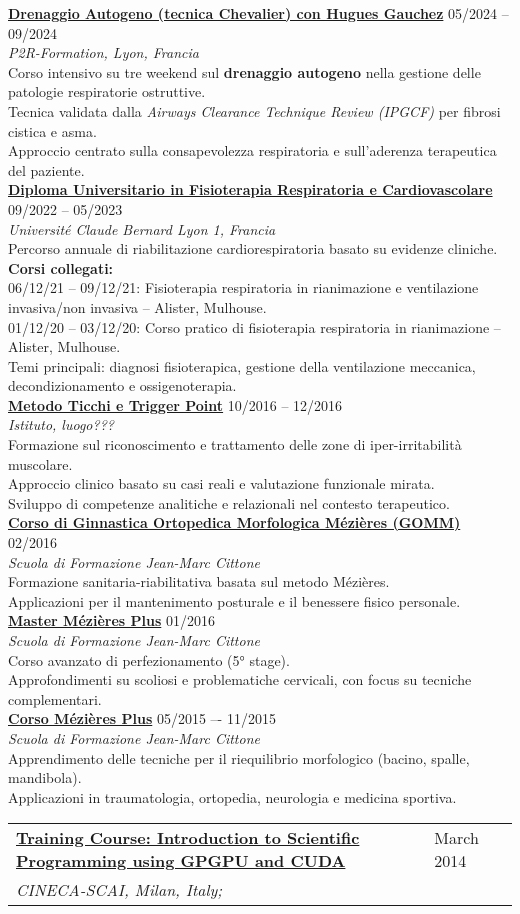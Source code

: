 \documentclass[a4paper]{article}
\newcommand{\longvoice}[8]{
    \begin{tabular}{p{0.83\linewidth} p{0.17\linewidth} }
        \textbf{\href{#3}{#2: #1}} & #4 
        \\ 
        \textit{#5, #6, #7;} & {\small\emph{#8}}
    \end{tabular}
    \vspace{.5em}
    }
\newcommand{\voice}[5]{\href{#4}{\textbf{#1}} \hfill #2 \\ \textit{#3} \\ {\small #5} \vspace{0.2cm} \\}
\begin{document}
    \voice{Drenaggio Autogeno (tecnica Chevalier) con Hugues Gauchez}
    {05/2024 – 09/2024}
    {P2R-Formation, Lyon, Francia}
    {}
    {
    Corso intensivo su tre weekend sul \textbf{drenaggio autogeno} nella gestione delle patologie respiratorie ostruttive.\\
    Tecnica validata dalla \emph{Airways Clearance Technique Review (IPGCF)} per fibrosi cistica e asma.\\
    Approccio centrato sulla consapevolezza respiratoria e sull’aderenza terapeutica del paziente.
    }
    \voice{Diploma Universitario in Fisioterapia Respiratoria e Cardiovascolare}
    {09/2022 – 05/2023}
    {Université Claude Bernard Lyon 1, Francia}
    {}
    {
    Percorso annuale di riabilitazione cardiorespiratoria basato su evidenze cliniche.\\
    \textbf{Corsi collegati:}\\
    06/12/21 – 09/12/21: Fisioterapia respiratoria in rianimazione e ventilazione invasiva/non invasiva – Alister, Mulhouse.\\
    01/12/20 – 03/12/20: Corso pratico di fisioterapia respiratoria in rianimazione – Alister, Mulhouse.\\
    Temi principali: diagnosi fisioterapica, gestione della ventilazione meccanica, decondizionamento e ossigenoterapia.
    }
    \voice{Metodo Ticchi e Trigger Point}
    {10/2016 -- 12/2016}
    {Istituto, luogo???}
    {}
    {
    Formazione sul riconoscimento e trattamento delle zone di iper-irritabilità muscolare.\\
    Approccio clinico basato su casi reali e valutazione funzionale mirata.\\
    Sviluppo di competenze analitiche e relazionali nel contesto terapeutico.
    }
    \voice{Corso di Ginnastica Ortopedica Morfologica Mézières (GOMM)}
    {02/2016}
    {Scuola di Formazione Jean-Marc Cittone}
    {}
    {
    Formazione sanitaria-riabilitativa basata sul metodo Mézières.\\
    Applicazioni per il mantenimento posturale e il benessere fisico personale.
    }
    \voice{Master Mézières Plus}
    {01/2016}
    {Scuola di Formazione Jean-Marc Cittone}
    {}
    {
    Corso avanzato di perfezionamento (5° stage).\\
    Approfondimenti su scoliosi e problematiche cervicali, con focus su tecniche complementari.
    }
    \voice{Corso Mézières Plus}
    {05/2015 –- 11/2015}
    {Scuola di Formazione Jean-Marc Cittone}
    {}
    {
    Apprendimento delle tecniche per il riequilibrio morfologico (bacino, spalle, mandibola).\\
    Applicazioni in traumatologia, ortopedia, neurologia e medicina sportiva.
    }

    \longvoice{Introduction to Scientific Programming using GPGPU and CUDA}
        {Training Course}
        {https://web.archive.org/web/20170623171128/http://www.hpc.cineca.it/content/introduction-to-gpu}
        {March 2014}
        {CINECA-SCAI}
        {Milan}
        {Italy}
        {}
    
\end{document}
